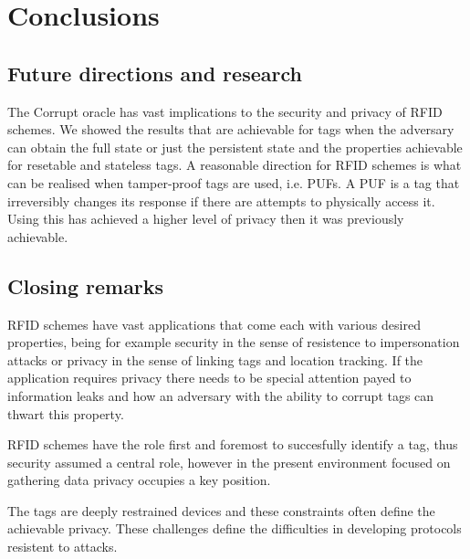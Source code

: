 \chapter*{Conclusions} 

\section{Future directions and research}
The Corrupt oracle has vast implications to the security and privacy of RFID schemes. We showed the results that are achievable for tags
when the adversary can obtain the full state or just the persistent state and the properties achievable for resetable and stateless tags.
A reasonable direction for RFID schemes is what can be realised when tamper-proof tags are used, i.e. PUFs. A PUF is a tag that irreversibly changes 
its response if there are attempts to physically access it. Using this \cite{PUFs} has achieved a higher level of privacy then it was 
previously achievable.

\section{Closing remarks}
RFID schemes have vast applications that come each with various desired properties, being for example security in the sense of resistence to impersonation attacks 
or privacy in the sense of linking tags and location tracking. If the application requires privacy there needs to be special attention payed to information leaks
and how an adversary with the ability to corrupt tags can thwart this property.

RFID schemes have the role first and foremost to succesfully identify a tag, thus security assumed a central role, however in the present environment focused on 
gathering data privacy occupies a key position.

The tags are deeply restrained devices and these constraints often define the achievable privacy. These challenges define the difficulties in developing protocols
resistent to attacks.